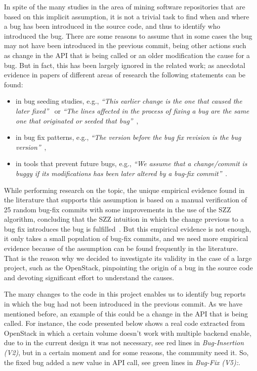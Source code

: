 \documentclass[ifip]{svmult}
\begin{document}
In spite of the many studies in the area of mining software repositories that are based on this implicit assumption, it is not a trivial task to find when and where a bug has been introduced in the source code, and thus to identify who introduced the bug. There are some reasons to assume that in some cases the bug may not have been introduced in the previous commit, being other actions such as change in the API that is being called or an older modification the cause for a bug. But in fact, this has been largely ignored in the related work; as anecdotal evidence in papers of different areas of research the following statements can be found: 

\begin{itemize}
  \item in bug seeding studies, e.g., \textit{``This earlier change is the one that caused the later fixed''}~\cite{williams2008szz} or \textit{``The lines affected in the process of fixing a bug are the same one that originated or seeded that bug''}~\cite{izquierdo2011developers},
  \item in bug fix patterns, e.g., \textit{``The version before the bug fix revision is the bug version''}~\cite{pan2009toward},
  \item in tools that prevent future bugs, e.g., \textit{``We assume that a change/commit is buggy if its modifications has been later altered by a bug-fix commit''}~\cite{fejzer2015supporting}. 
\end{itemize}

While performing research on the topic, the unique empirical evidence found in the literature that supports this assumption is based on a manual verification of 25 random bug-fix commits with some improvements in the use of the SZZ algorithm, concluding that the SZZ intuition in which the change previous to a bug fix introduces the bug is fulfilled~\cite{williams2008szz}. But this empirical evidence is not enough, it only takes a small population of bug-fix commits, and we need more empirical evidence because of the assumption can be found frequently in the literature. That is the reason why we decided to investigate its validity in the case of a large project, such as the OpenStack, pinpointing the origin of a bug in the source code and devoting significant effort to understand the causes. 

The many changes to the code in this project enables us to identify bug reports in which the bug had not been introduced in the previous commit. As we have mentioned before, an example of this could be a change in the API that is being called. For instance, the code presented below shows a real code extracted from OpenStack in which a certain volume doesn't work with multiple backend enable, due to in the current design it was not necessary, see red lines in \textit{Bug-Insertion (V2)}, but in a certain moment and for some reasons, the community need it. So, the fixed bug added a new value in API call, see green lines in \textit{Bug-Fix (V5):}. 
\end{document}
